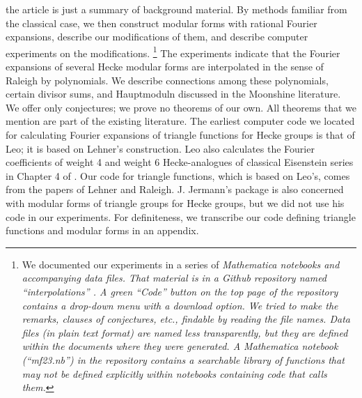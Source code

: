 \documentclass{article}
\begin{document}
the article is just
a summary of
background
material.
By methods familiar
from the classical case, 
we then construct modular forms
with rational Fourier expansions,
describe our modifications of them,
and describe computer experiments
on the modifications. 
\footnote{We documented our experiments in
a series of \it Mathematica \rm notebooks
and accompanying data files.
That material 
is in a \it Github \rm repository 
named ``interpolations'' \cite{test3}. 
A green ``Code'' button on the top page of 
the repository contains a drop-down menu
with a download option.
We tried to
make the remarks, clauses
of conjectures, \it etc., \rm findable by
reading the file names. Data files
(in plain text format) 
are named less transparently, but
they are defined within the
documents where they were generated.
A \it Mathematica \rm notebook 
(``mf23.nb'') in the repository
contains a searchable library 
of functions that may not be defined
explicitly within notebooks 
containing code that calls them.}
\newline \newline \noindent
The experiments indicate that the Fourier
expansions of several
Hecke modular forms are interpolated
in the sense of Raleigh by polynomials.
We describe connections among
these polynomials, certain
divisor sums, and Hauptmoduln 
discussed in  the
Moonshine literature.
We offer only conjectures; 
we prove no theorems
of our own. All theorems that
we mention are part of
the existing literature.
\newline \newline \noindent
The earliest 
computer code
we located 
for calculating 
Fourier 
expansions of 
triangle functions for Hecke groups
is that of Leo; 
it is based on Lehner's 
construction. Leo also
calculates the Fourier coefficients
of weight 4 and weight 6
Hecke-analogues of classical Eisenstein
series in Chapter 4 of \cite{leo2008fourier}.
Our code for triangle functions,
which is based on Leo's,
comes from the papers of 
Lehner and Raleigh.
J. Jermann's package \cite{sagemath}
is also concerned with modular forms
of triangle groups for Hecke groups,
but we did not use his code in our experiments.
For definiteness, we transcribe
our code defining triangle functions
and modular forms in an appendix.
\end{document}
